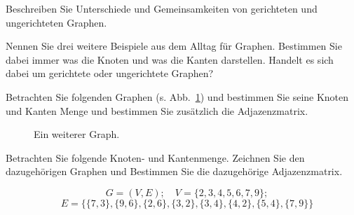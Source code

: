 \begin{kontr}
Beschreiben Sie Unterschiede und Gemeinsamkeiten von gerichteten und ungerichteten Graphen.
\end{kontr}


\begin{kontr}
Nennen Sie drei weitere Beispiele aus dem Alltag für Graphen. 
Bestimmen Sie dabei immer was die Knoten und was die Kanten darstellen. 
Handelt es sich dabei um gerichtete oder ungerichtete Graphen?
\end{kontr}


\begin{kontr}
Betrachten Sie folgenden Graphen (s. Abb.~\ref{fig:kont:graph}) und bestimmen Sie seine Knoten und Kanten Menge und bestimmen Sie zusätzlich die Adjazenzmatrix.

\begin{figure}[htb]
\begin{center}
\caption{Ein weiterer Graph.}
\label{fig:kont:graph}
\end{center}
\end{figure}

\end{kontr}

\begin{kontr}
Betrachten Sie folgende Knoten- und Kantenmenge. Zeichnen Sie den dazugehörigen Graphen und Bestimmen Sie die dazugehörige Adjazenzmatrix.

\[ \quad G = (V, E); \quad V = \{2,3,4,5,6,7,9\}; \] 
\[\quad E =  \{ \{7,3\},\{9,6\}, \{2,6\}, \{3,2\}, \{3,4\}, \{4,2\}, \{5,4\}, \{7,9\}\} \]

\end{kontr}

